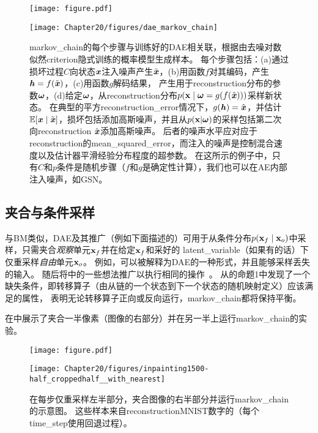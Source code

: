 \begin{figure}[!htb]
\ifOpenSource
\centerline{\texttt{[image: figure.pdf]}}
\else
\centerline{\texttt{[image: Chapter20/figures/dae\_markov\_chain]}}
\fi
\caption{\gls{markov_chain}的每个步骤与训练好的\gls{DAE}相关联，根据由去噪对数似然\gls{criterion}隐式训练的概率模型生成样本。
每个步骤包括：(a)通过损坏过程$C$向状态$\boldsymbol{\mathit{x}}$注入噪声产生$\tilde{\boldsymbol{\mathit{x}}}$，(b)用函数$f$对其编码，产生$\boldsymbol{\mathit{h}} = f(\tilde{\boldsymbol{\mathit{x}}})$，(c)用函数$g$解码结果， 产生用于\gls{reconstruction}分布的参数$\boldsymbol{\omega}$，(d)给定$\boldsymbol{\omega}$，从\gls{reconstruction}分布$p(\mathbf{x} \mid \boldsymbol{\omega} = g(f(\tilde{\boldsymbol{\mathit{x}}})))$采样新状态。
在典型的平方\gls{reconstruction_error}情况下，$g(\boldsymbol{\mathit{h}}) = \hat{\boldsymbol{\mathit{x}}}$，并估计$\mathbb{E} [ \boldsymbol{\mathit{x}} \mid \tilde{\boldsymbol{\mathit{x}}}]$，损坏包括添加高斯噪声，并且从$p(\mathbf{x} | \boldsymbol{\omega})$的采样包括第二次向\gls{reconstruction} $\hat{\boldsymbol{\mathit{x}}}$添加高斯噪声。
后者的噪声水平应对应于\gls{reconstruction}的\gls{mean_squared_error}，而注入的噪声是控制混合速度以及估计器平滑经验分布程度的超参数\citep{Vincent-NC-2011-small}。
在这所示的例子中，只有$C$和$p$条件是随机步骤（$f$和$g$是确定性计算），我们也可以在\gls{AE}内部注入噪声，如\gls{GSN}\citep{Bengio-et-al-ICML-2014}。
}
\label{fig:chap20_dae_markov_chain}
\end{figure}


\subsection{夹合与条件采样}
\label{sec:clamping_and_conditional_sampling}

与\gls{BM}类似，\gls{DAE}及其推广（例如下面描述的）可用于从条件分布$p(\mathbf{x}_f  \mid  \mathbf{x}_o)$中采样，只需夹合\emph{观察}单元$\mathbf{x}_f$并在给定$\mathbf{x}_f$和采好的 \gls{latent_variable}（如果有的话）下仅重采样\emph{自由}单元$\mathbf{x}_o$。
例如，可以被解释为\gls{DAE}的一种形式，并且能够采样丢失的输入。
随后将中的一些想法推广以执行相同的操作~\citep{Bengio-et-al-ICML-2014}。
\citet{Alain-et-al-arxiv2015} 从\citet{Bengio-et-al-ICML-2014}的命题1中发现了一个缺失条件，即转移算子（由从链的一个状态到下一个状态的随机映射定义）应该满足的属性， 表明无论转移算子正向或反向运行，\gls{markov_chain}都将保持平衡。

在中展示了夹合一半像素（图像的右部分）并在另一半上运行\gls{markov_chain}的实验。

\begin{figure}[!htb]
\ifOpenSource
\centerline{\texttt{[image: figure.pdf]}}
\else
\centerline{\texttt{[image: Chapter20/figures/inpainting1500-half\_croppedhalf\_\_with\_nearest]}}
\fi
\caption{在每步仅重采样左半部分，夹合图像的右半部分并运行\gls{markov_chain}的示意图。
这些样本来自\gls{reconstruction}MNIST数字的（每个\gls{time_step}使用回退过程）。
}
\label{fig:chap20_inpainting1500-half_croppedhalf__with_nearest}
\end{figure}

